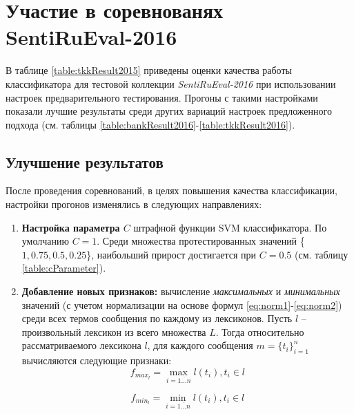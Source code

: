 \section{Участие в соревнованях SentiRuEval-2016}

В таблице \ref{table:tkkResult2015} приведены оценки качества работы
классификатора для тестовой коллекции {\it SentiRuEval-2016} \cite{dialog2016}
при использовании настроек предварительного тестирования.
Прогоны с такими настройками показали лучшие результаты среди других
вариаций настроек предложенного подхода (см. таблицы \ref{table:bankResult2016}-\ref{table:tkkResult2016}).





\subsection{Улучшение результатов}

После проведения соревнований, в целях повышения качества классификации,
настройки прогонов изменялись в следующих направлениях:
\begin{enumerate}
    \item {\bf Настройка параметра $C$} штрафной функции SVM классификатора.
        По умолчанию $C=1$.
        Среди множества протестированных значений \{$1, 0.75, 0.5, 0.25$\},
        наибольший прирост достигается при {\bf $C = 0.5$} (см. таблицу \ref{table:cParameter}).
    \item {\bf Добавление новых признаков:} вычисление {\it максимальных} и
        {\it минимальных} значений (с учетом нормализации на основе формул
        \ref{eq:norm1}-\ref{eq:norm2}) среди всех термов сообщения по каждому
        из лексиконов.
        Пусть $l$ -- произвольный лексикон из всего множества $L$.
        Тогда относительно рассматриваемого лексикона $l$, для каждого сообщения
        $m = \{t_i\}_{i=1}^n$ вычисляются следующие признаки:
        \begin{equation}
            f_{max_l} = \max_{i=\overline{1 \ldots n}}l(t_i), t_i \in l \nonumber
        \end{equation}

        \begin{equation}
            f_{min_l} = \min\limits_{i=\overline{1 \ldots n}}l(t_i), t_i \in l \nonumber
        \end{equation}
\end{enumerate}

